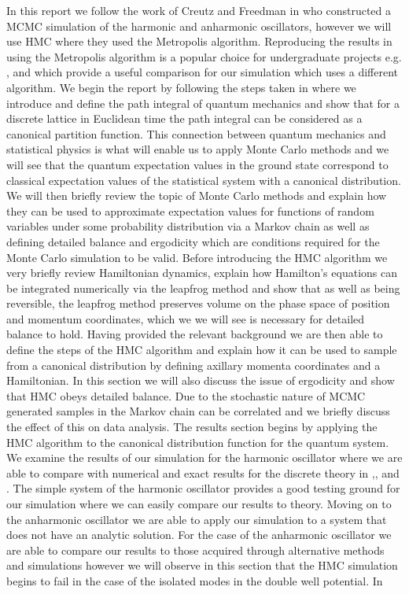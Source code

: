 \documentclass[12pt]{article}
\begin{document}
 In this report we follow the work of Creutz and Freedman in \cite{creutz_freedman_1981} who constructed a MCMC simulation of the harmonic and anharmonic oscillators, however we will use HMC where they used the Metropolis algorithm. Reproducing the results in \cite{creutz_freedman_1981} using the Metropolis algorithm is a popular choice for undergraduate projects e.g. \cite{westbroek_king_vvedensky_durr_2017}, \cite{rodgers_raes} and \cite{slapik_serenone} which provide a useful comparison for our simulation which uses a different algorithm. We begin the report by following the steps taken in \cite{creutz_freedman_1981} where we introduce and define the path integral of quantum mechanics and show that for a discrete lattice in Euclidean time the path integral can be considered as a canonical partition function. This connection between quantum mechanics and statistical physics is what will enable us to apply Monte Carlo methods and we will see that the quantum expectation values in the ground state correspond to classical expectation values of the statistical system with a canonical distribution. We will then briefly review the topic of Monte Carlo methods and explain how they can be used to approximate expectation values for functions of random variables under some probability distribution via a Markov chain as well as defining detailed balance and ergodicity which are conditions required for the Monte Carlo simulation to be valid. Before introducing the HMC algorithm we very briefly review Hamiltonian dynamics, explain how Hamilton's equations can be integrated numerically via the leapfrog method and show that as well as being reversible, the leapfrog method preserves volume on the phase space of position and momentum coordinates, which we we will see is necessary for detailed balance to hold. Having provided the relevant background we are then able to define the steps of the HMC algorithm and explain how it can be used to sample from a canonical distribution by defining axillary momenta coordinates and a Hamiltonian. In this section we will also discuss the issue of ergodicity and show that HMC obeys detailed balance. Due to the stochastic nature of MCMC generated samples in the Markov chain can be correlated and we briefly discuss the effect of this on data analysis. The results section begins by applying the HMC algorithm to the canonical distribution function for the quantum system. We examine the results of our simulation for the harmonic oscillator where we are able to compare with numerical and exact results for the discrete theory in \cite{creutz_freedman_1981},\cite{westbroek_king_vvedensky_durr_2017}, \cite{rodgers_raes} and \cite{slapik_serenone}. The simple system of the harmonic oscillator provides a good testing ground for our simulation where we can easily compare our results to theory. Moving on to the anharmonic oscillator we are able to apply our simulation to a system that does not have an analytic solution. For the case of the anharmonic oscillator we are able to compare our results to those acquired through alternative methods \cite{blankenbecler_degrand_sugar_1980} and simulations \cite{rodgers_raes} however we will observe in this section that the HMC simulation begins to fail in the case of the isolated modes in the double well potential. In 
\end{document}
